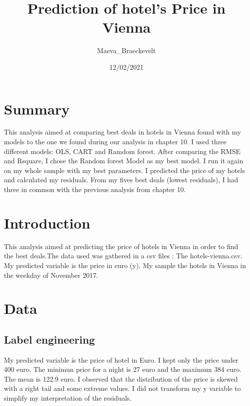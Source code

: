 \documentclass[
]{article}
\title{Prediction of hotel's Price in Vienna}
\author{Maeva\_Braeckevelt}
\date{12/02/2021}
\begin{document}
\maketitle

\hypertarget{summary}{%
\section{Summary}\label{summary}}

This analysis aimed at comparing best deals in hotels in Vienna found
with my models to the one we found during our analysis in chapter 10. I
used three different models: OLS, CART and Ramdom forest. After
comparing the RMSE and Rsquare, I chose the Random forest Model as my
best model. I run it again on my whole sample with my best parameters. I
predicted the price of my hotels and calculated my residuals. From my
fives best deals (lowest residuals), I had three in common with the
previous analysis from chapter 10.

\hypertarget{introduction}{%
\section{Introduction}\label{introduction}}

This analysis aimed at predicting the price of hotels in Vienna in order
to find the best deals.The data used was gathered in a csv files : The
hotels-vienna.csv. My predicted variable is the price in euro (y). My
sample the hotels in Vienna in the weekday of November 2017.

\hypertarget{data}{%
\section{Data}\label{data}}

\hypertarget{label-engineering}{%
\subsection{Label engineering}\label{label-engineering}}

My predicted variable is the price of hotel in Euro. I kept only the
price under 400 euro. The minimun price for a night is 27 euro and the
maximum 384 euro. The mean is 122.9 euro. I observed that the
distribution of the price is skewed with a right tail and some extreme
values. I did not transform my y variable to simplify my interpretation
of the residuals.
\end{document}
